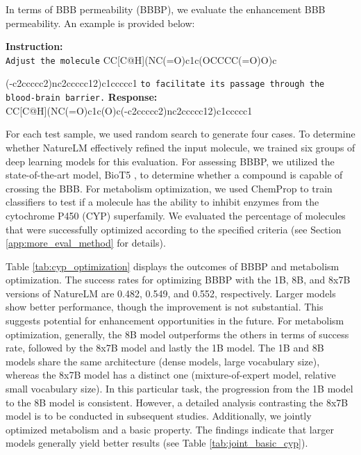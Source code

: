 In terms of BBB permeability (BBBP), we evaluate the enhancement BBB permeability. An example is provided below:

\begin{example}
{{
\small
\noindent\textbf{Instruction:}\\ \texttt{Adjust the molecule} \mol{}CC[C@H](NC(=O)c1c(OCCCC(=O)O)c

\noindent(-c2ccccc2)nc2ccccc12)c1ccccc1\emol{} \texttt{to facilitate its passage through the blood-brain barrier.}
\newline
\noindent\textbf{Response:} \\\mol{}CC[C@H](NC(=O)c1c(O)c(-c2ccccc2)nc2ccccc12)c1ccccc1\emol{}
}}
\end{example}

For each test sample, we used random search to generate four cases. To determine whether NatureLM effectively refined the input molecule, we trained six groups of deep learning models for this evaluation. For assessing BBBP, we utilized the state-of-the-art model, BioT5 \cite{PeiQizhi2023BioT5}, to determine whether a compound is capable of crossing the BBB. For metabolism optimization, we used ChemProp \cite{yang2019analyzing} to train classifiers to test if a molecule has the ability to inhibit enzymes from the cytochrome P450 (CYP) superfamily. We evaluated the percentage of molecules that were successfully optimized according to the specified criteria (see Section \ref{app:more_eval_method} for details). 

Table \ref{tab:cyp_optimization} displays the outcomes of BBBP and metabolism optimization. The success rates for optimizing BBBP with the 1B, 8B, and 8x7B versions of NatureLM are 0.482, 0.549, and 0.552, respectively. Larger models show better performance, though the improvement is not substantial. This suggests potential for enhancement opportunities in the future. For metabolism optimization, generally, the 8B model outperforms the others in terms of success rate, followed by the 8x7B model and lastly the 1B model. The 1B and 8B models share the same architecture (dense models, large vocabulary size), whereas the 8x7B model has a distinct one (mixture-of-expert model, relative small vocabulary size). In this particular task, the progression from the 1B model to the 8B model is consistent. However, a detailed analysis contrasting the 8x7B model is to be conducted in subsequent studies. Additionally, we jointly optimized metabolism and a basic property. The findings indicate that larger models generally yield better results (see Table \ref{tab:joint_basic_cyp}).

